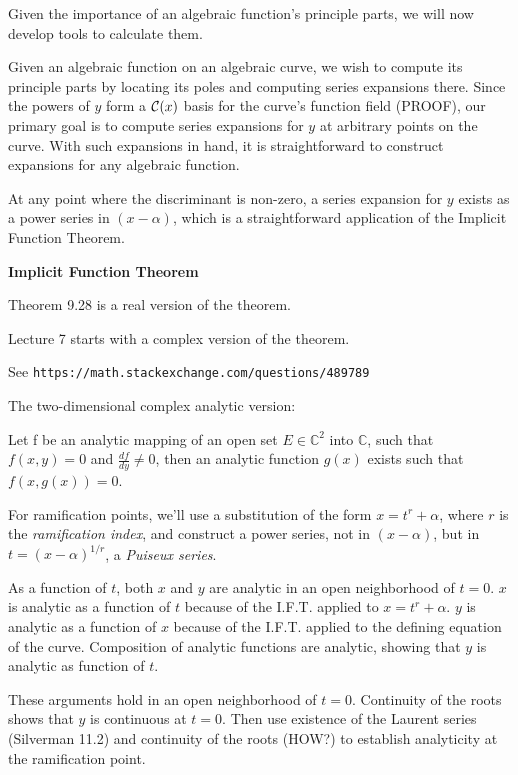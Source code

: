 \endtheorem

Given the importance of an algebraic function's principle parts, we will
now develop tools to calculate them.

\vfill\eject


Given an algebraic function on an algebraic curve, we wish to compute
its principle parts by locating its poles and computing series
expansions there.  Since the powers of $y$ form a ${\cal C}(x)$ basis
for the curve's function field (PROOF), our primary goal is to compute
series expansions for $y$ at arbitrary points on the curve.  With such
expansions in hand, it is straightforward to construct expansions for
any algebraic function.

At any point where the discriminant is non-zero, a series expansion
for $y$ exists as a power series in $(x-\alpha)$, which is a
straightforward application of the Implicit Function Theorem.

\theorem
{\bf Implicit Function Theorem}
\label{implicit function theorem}

\cite{baby rudin} Theorem 9.28 is a real version of the theorem.

\cite{guillemin} Lecture 7 starts with a complex version of the theorem.

See {\tt https://math.stackexchange.com/questions/489789}

The two-dimensional complex analytic version:

Let f be an analytic
mapping of an open set $E \in {\mathbb C}^2$ into ${\mathbb C}$, such
that $f(x,y)=0$ and $\frac{df}{dy} \ne 0$, then an analytic
function $g(x)$ exists such that $f(x,g(x))=0$.
\endtheorem


For ramification points, we'll use a substitution of the form
$x=t^r+\alpha$, where $r$ is the {\it ramification index}, and
construct a power series, not in $(x-\alpha)$, but in
$t=(x-\alpha)^{1/r}$, a {\it Puiseux series}.

As a function of $t$, both $x$ and $y$ are analytic in an open
neighborhood of $t=0$.  $x$ is analytic as a function of $t$ because
of the I.F.T. applied to $x=t^r+\alpha$.  $y$ is analytic as a
function of $x$ because of the I.F.T. applied to the defining equation
of the curve.  Composition of analytic functions are analytic,
showing that $y$ is analytic as function of $t$.

These arguments hold in an open neighborhood of $t=0$.  Continuity of
the roots shows that $y$ is continuous at $t=0$.  Then use existence
of the Laurent series (Silverman 11.2) and continuity of the roots
(HOW?) to establish analyticity at the ramification point.

